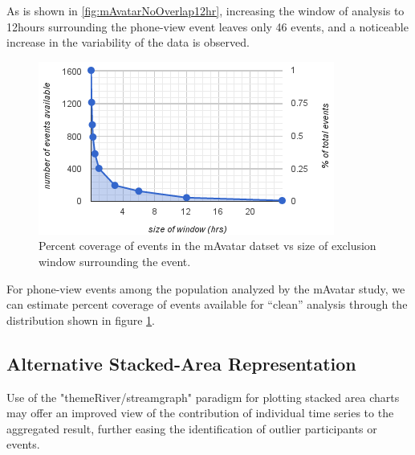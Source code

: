 As is shown in \ref{fig:mAvatarNoOverlap12hr}, increasing the window of analysis to 12hours surrounding the phone-view event leaves only 46 events, and a noticeable increase in the variability of the data is observed.

\begin{figure}
\centering
\includegraphics[width=0.9\columnwidth]{./img/events_v_windowSize.png}
\caption{Percent coverage of events in the mAvatar datset vs size of exclusion window surrounding the event.}
\label{fig:eventsVwindow}
\end{figure}

For phone-view events among the population analyzed by the mAvatar study, we can estimate percent coverage of events available for ``clean'' analysis through the distribution shown in figure \ref{fig:eventsVwindow}.

\subsection{Alternative Stacked-Area Representation}
Use of the "themeRiver/streamgraph" \cite{havre2000, byron2008} paradigm for plotting stacked area charts may offer an improved view of the contribution of individual time series to the aggregated result, further easing the identification of outlier participants or events.


